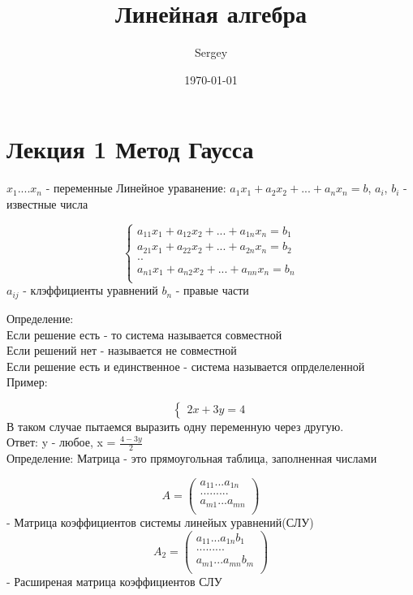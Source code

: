 \documentclass[a4paper]{article}
\author{Sergey}
\title{Линейная алгебра}
\date{\today}
\begin{document}
\maketitle

\newpage

\section{Лекция 1 Метод Гаусса}

$x_1....x_n$ - переменные
Линейное ураванение: $a_1x_1 + a_2x_2 + ... + a_nx_n = b$, $a_i$, $b_i$ - известные числа


\begin{equation*}
 \begin{cases}
 a_{11}x_1 + a_{12}x_2 + ... + a_{1n}x_n = b_1 \\
 a_{21}x_1 + a_{22}x_2 + ... + a_{2n}x_n = b_2 \\
   ..\\
   a_{n1}x_1 + a_{n2}x_2 + ... + a_{nn}x_n = b_n \\
 \end{cases}
\end{equation*}
$a_{ij} $ - клэффициенты уравнений
$b_n$ - правые части



Определение:\\
Если решение есть - то система называется совместной\\
Если решений нет - называется не совместной\\
Если решение есть и единственное - система называется опрделеленной\\

Пример:

\begin{equation*}
 \begin{cases}
   2x + 3y = 4
 \end{cases}
\end{equation*}
В таком случае пытаемся выразить одну переменную через другую.\\
Ответ: y - любое, x = $\frac{4-3y}{2}$\\

Определение: Матрица - это прямоугольная таблица, заполненная числами

\begin{equation*}
A = 
\begin{pmatrix}
  a_{11} ... a_{1n}\\
  ... ... ...\\
    a_{m1} ... a_{mn}\\
\end{pmatrix}
\end{equation*}
- Матрица коэффициентов системы линейых уравнений(СЛУ)
\begin{equation*}
A_2 = 
\begin{pmatrix}
  a_{11} ... a_{1n}  b_1\\
  ... ... ...\\
    a_{m1} ... a_{mn} b_m\\
\end{pmatrix}
\end{equation*}
- Расширеная матрица коэффициентов СЛУ
\end{document}

